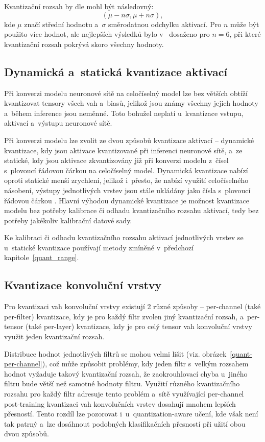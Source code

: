 Kvantizační rozsah by dle \cite{nagel2019datafree} mohl být následovný:
\begin{equation}
(\mu - n\sigma,\mu + n\sigma),
\end{equation}
kde $\mu$ značí střední hodnotu a~$\sigma$ směrodatnou odchylku aktivací. Pro $n$ může být použito více hodnot, ale nejlepších výsledků bylo v~\cite{nagel2019datafree} dosaženo pro $n=6$, při které kvantizační rozsah pokrývá skoro všechny hodnoty.

\subsection{Dynamická a~statická kvantizace aktivací}
Při konverzi modelu neuronové sítě na celočíselný model lze bez větších obtíží kvantizovat tensory všech vah a~biasů, jelikož jsou známy všechny jejich hodnoty a~během inference jsou neměnné. Toto bohužel neplatí u~kvantizace vstupu, aktivací a~výstupu neuronové sítě.

Při konverzi modelu lze zvolit ze dvou způsobů kvantizace aktivací -- dynamické kvantizace, kdy jsou aktivace kvantizované při inferenci neuronové sítě, a~ze statické, kdy jsou aktivace zkvantizovány již při konverzi modelu z~čísel s~plovoucí řádovou čárkou na celočíselný model. Dynamická kvantizace nabízí oproti statické menší zrychlení, jelikož i~přesto, že nabízí využití celočíselného násobení, výstupy jednotlivých vrstev jsou stále ukládány jako čísla s~plovoucí řádovou čárkou \cite{post-quant-tf}. Hlavní výhodou dynamické kvantizace je možnost kvantizace modelu bez potřeby kalibrace či odhadu kvantizačního rozsahu aktivací, tedy bez potřeby jakékoliv kalibrační datové sady.

Ke kalibraci či odhadu kvantizačního rozsahu aktivací jednotlivých vrstev se u~statické kvantizace používají metody zmíněné v~předchozí kapitole~\ref{quant_range}.

\subsection{Kvantizace konvoluční vrstvy}
Pro kvantizaci vah konvoluční vrstvy existují 2 různé způsoby -- per-channel (také per-filter) kvantizace, kdy je pro každý filtr zvolen jiný kvantizační rozsah, a~per-tensor (také per-layer) kvantizace, kdy je pro celý tensor vah konvoluční vrstvy využit jeden kvantizační rozsah.

Distribuce hodnot jednotlivých filtrů se mohou velmi lišit (viz. obrázek~\ref{quant-per-channel}), což může způsobit problémy, kdy jeden filtr s~velkým rozsahem hodnot vyžaduje takový kvantizační rozsah, že zaokrouhlovací chyba u~jiného filtru bude větší než samotné hodnoty filtru. Využití různého kvantizačního rozsahu pro každý filtr adresuje tento problém a~sítě využívající per-channel post-training kvantizaci vah konvolučních vrstev dosahují mnohem lepších přesností. Tento rozdíl lze pozorovat i~u~quantization-aware učení, kde však není tak patrný a~lze dosáhnout podobných klasifikačních přesností při užití obou dvou způsobů.

